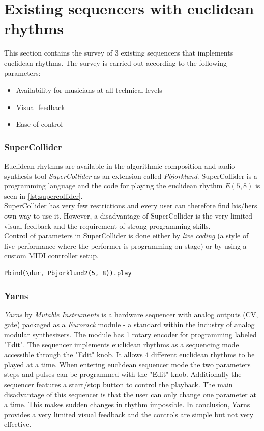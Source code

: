 \section{Existing sequencers with euclidean rhythms}
\label{sec:existing}
This section contains the survey of 3 existing sequencers that implements euclidean rhythms. The survey is carried out according to the following parameters:
\begin{itemize}
\item Availability for musicians at all technical levels
\item Visual feedback
\item Ease of control
\end{itemize}

\subsubsection{SuperCollider}
Euclidean rhythms are available in the algorithmic composition and audio synthesis tool \textit{SuperCollider} as an extension called \textit{Pbjorklund}. SuperCollider is a programming language and the code for playing the euclidean rhythm $E(5,8)$ is seen in \cref{lst:supercollider}.\\ SuperCollider has very few restrictions and every user can therefore find his/hers own way to use it. However, a disadvantage of SuperCollider is the very limited visual feedback and the requirement of strong programming skills.\\
Control of parameters in SuperCollider is done either by \textit{live coding} (a style of live performance where the performer is programming on stage) or by using a custom MIDI controller setup.

\begin{lstlisting}[caption={Euclidean rhythm $E(5,8)$ in SuperCollider}, label={lst:supercollider}]
Pbind(\dur, Pbjorklund2(5, 8)).play
\end{lstlisting}

\subsubsection{Yarns}
\textit{Yarns} by \textit{Mutable Instruments} is a hardware sequencer with analog outputs (CV, gate) packaged as a \textit{Eurorack} module - a standard within the industry of analog modular synthesizers. The module has 1 rotary encoder for programming labeled "Edit". The sequencer implements euclidean rhythms as a sequencing mode accessible through the "Edit" knob. It allows 4 different euclidean rhythms to be played at a time. When entering euclidean sequencer mode the two parameters steps and pulses can be programmed with the "Edit" knob. Additionally the sequencer features a start/stop button to control the playback. The main disadvantage of this sequencer is that the user can only change one parameter at a time. This makes sudden changes in rhythm impossible. In conclusion, Yarns provides a very limited visual feedback and the controls are simple but not very effective.

